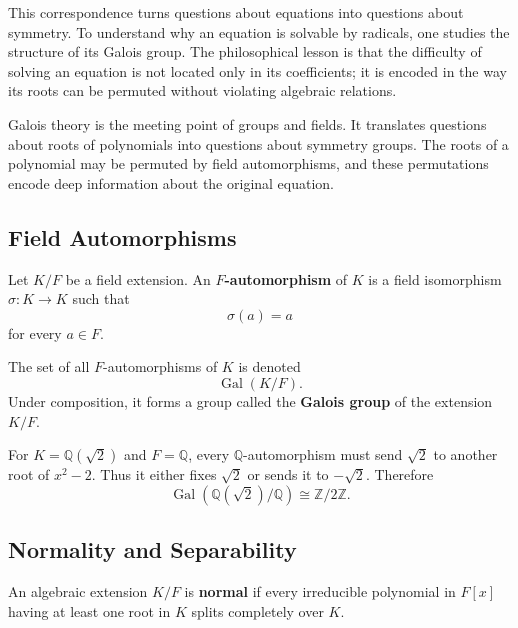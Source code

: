 This correspondence turns questions about equations into questions about symmetry. To understand why an equation is solvable by radicals, one studies the structure of its Galois group. The philosophical lesson is that the difficulty of solving an equation is not located only in its coefficients; it is encoded in the way its roots can be permuted without violating algebraic relations.

Galois theory is the meeting point of groups and fields. It translates questions about roots of polynomials into questions about symmetry groups. The roots of a polynomial may be permuted by field automorphisms, and these permutations encode deep information about the original equation.

\subsection{Field Automorphisms}

\begin{definition}
Let $K/F$ be a field extension. An \textbf{$F$-automorphism} of $K$ is a field isomorphism $\sigma:K\to K$ such that
\[
    \sigma(a)=a
\]
for every $a\in F$.
\end{definition}

\begin{definition}
The set of all $F$-automorphisms of $K$ is denoted
\[
    \operatorname{Gal}(K/F).
\]
Under composition, it forms a group called the \textbf{Galois group} of the extension $K/F$.
\end{definition}

\begin{example}
For $K=\mathbb{Q}(\sqrt{2})$ and $F=\mathbb{Q}$, every $\mathbb{Q}$-automorphism must send $\sqrt{2}$ to another root of $x^2-2$. Thus it either fixes $\sqrt{2}$ or sends it to $-\sqrt{2}$. Therefore
\[
    \operatorname{Gal}(\mathbb{Q}(\sqrt{2})/\mathbb{Q})\cong \mathbb{Z}/2\mathbb{Z}.
\]
\end{example}

\subsection{Normality and Separability}

\begin{definition}
An algebraic extension $K/F$ is \textbf{normal} if every irreducible polynomial in $F[x]$ having at least one root in $K$ splits completely over $K$.
\end{definition}

